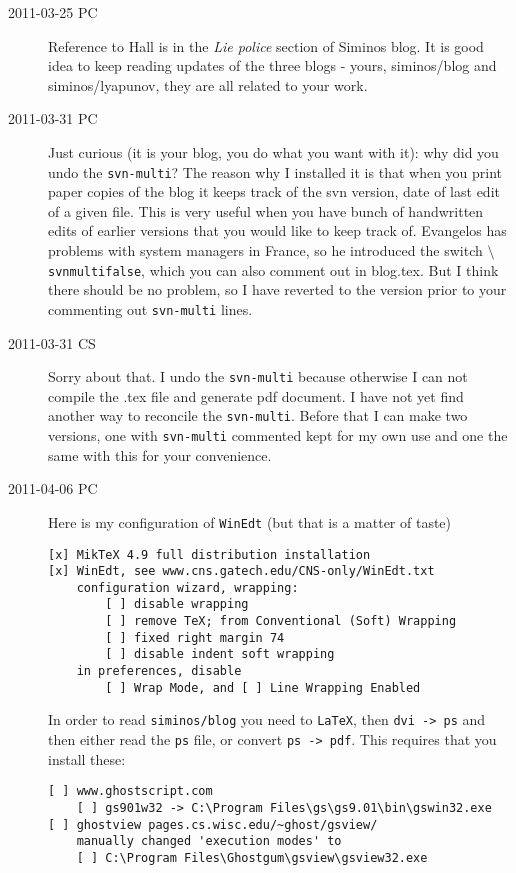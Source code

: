 \begin{description}
\item[2011-03-25 PC]
Reference to Hall is in the {\em Lie police} section of Siminos
blog. It is good idea to keep reading updates of the three blogs - yours,
siminos/blog and siminos/lyapunov, they are all related to your work.

\item[2011-03-31 PC] Just curious (it is your blog, you do what you want with it):
    why did you undo the \texttt{svn-multi}? The reason why I installed
    it is that when you print paper copies of the blog it keeps track of
    the svn version, date of last edit of a given file. This is very
    useful when you have bunch of handwritten edits of earlier versions
    that you would like to keep track of. Evangelos has problems with
    system managers in France, so he introduced the switch
    \texttt{$\setminus$svnmultifalse}, which you can also comment out in
    blog.tex. But I think there should be no problem, so I have reverted
    to the version prior to your commenting out \texttt{svn-multi} lines.

\item[2011-03-31 CS] Sorry about that. I undo the \texttt{svn-multi}
because otherwise I can not compile the .tex file and generate pdf
document. I have not yet find another way to reconcile the
\texttt{svn-multi}. Before that I can make two versions, one with
\texttt{svn-multi} commented kept for my own use and one the same with
this for your convenience.

\item[2011-04-06 PC] Here is my configuration of \texttt{WinEdt}
(but that is a matter of taste)

\begin{verbatim}
[x] MikTeX 4.9 full distribution installation
[x] WinEdt, see www.cns.gatech.edu/CNS-only/WinEdt.txt
	configuration wizard, wrapping:
        [ ] disable wrapping
		[ ] remove TeX; from Conventional (Soft) Wrapping
		[ ] fixed right margin 74
		[ ] disable indent soft wrapping
	in preferences, disable
		[ ] Wrap Mode, and [ ] Line Wrapping Enabled
\end{verbatim}

In order to read \texttt{siminos/blog} you need to \texttt{LaTeX},
then \texttt{dvi -> ps} and then either read the \texttt{ps} file, or
convert \texttt{ps -> pdf}. This requires that you install these:

\begin{verbatim}
[ ] www.ghostscript.com
    [ ] gs901w32 -> C:\Program Files\gs\gs9.01\bin\gswin32.exe
[ ] ghostview pages.cs.wisc.edu/~ghost/gsview/
    manually changed 'execution modes' to
    [ ] C:\Program Files\Ghostgum\gsview\gsview32.exe
\end{verbatim}


\end{description}
